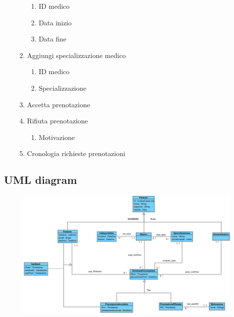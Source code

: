 \documentclass[12pt]{report}
\begin{document}
\begin{enumerate}
\begin{enumerate}
                    \begin{enumerate}
                        \item ID medico
                        \item Data inizio
                        \item Data fine
                    \end{enumerate}
                \item Aggiungi specializzazione medico
                    \begin{enumerate}
                        \item ID medico
                        \item Specializzazione
                    \end{enumerate}
                \item Accetta prenotazione
                \item Rifiuta prenotazione
                    \begin{enumerate}
                        \item Motivazione
                    \end{enumerate}
                \item Cronologia richieste prenotazioni
            \end{enumerate}
        
    \end{enumerate}
    
    \newpage
    
    \subsection{UML diagram}
    \begin{figure}[H]
        \centering
        \includegraphics[width=1\linewidth]{images/UML prenotazionimediche.png}
        \label{UML diagram}
    \end{figure}
\end{document}
